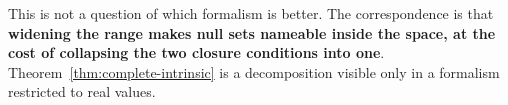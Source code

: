 \begin{remark}
  This is not a question of which formalism is better.
  The correspondence is that \textbf{widening the range makes null sets nameable
  inside the space, at the cost of collapsing the two closure conditions into
  one}.
  Theorem~\ref{thm:complete-intrinsic} is a decomposition visible only in a
  formalism restricted to real values.
\end{remark}
